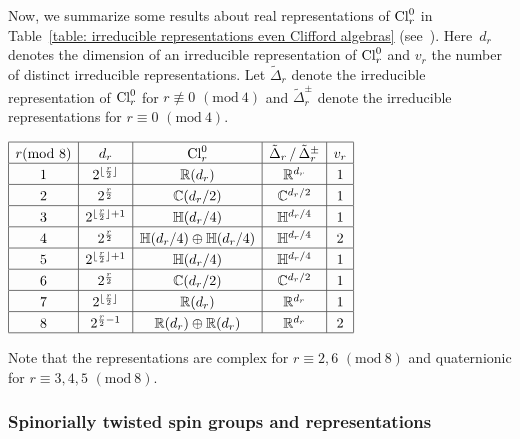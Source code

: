 \documentclass[10pt,a4paper]{amsart}
\newcommand\tstrut{\rule{0pt}{2.6ex}}
\numberwithin{equation}{section}
\begin{document}
Now, we summarize some results about real representations of ${\rm Cl}_r^0$ in Table~\ref{table: irreducible representations even Clifford algebras} (see~\cite{Lawson}). Here~$d_r$ denotes the dimension of an irreducible representation of ${\rm Cl}^0_r$ and $v_r$ the number of distinct irreducible representations. Let $\tilde\Delta_r$ denote the irreducible representation of ${\rm Cl}_r^0$ for $r\not\equiv0$ $(\text{mod}~4) $ and $\tilde\Delta^{\pm}_r$ denote the irreducible representations for $r\equiv0$ $(\text{mod}~4)$.
\begin{table}[h!]\centering
$
\begin{array}{|c|c|c|c|c|c|}
\hline
r(\text{mod}~8)&d_r&{\rm Cl}_r^0&\tilde\Delta_r\, / \,\tilde\Delta_r^\pm& v_r \tstrut\\
\hline
1&2^{\lfloor\frac r2\rfloor}&\mathbb R(d_r)&\mathbb{R}^{d_r}&1 \tstrut\\
\hline
2&2^{\frac r2}&\mathbb C(d_r/2)&\mathbb{C}^{d_r/2}&1 \tstrut\\
\hline
3&2^{\lfloor\frac r2\rfloor+1}&\mathbb H(d_r/4)&\mathbb{H}^{d_r/4}&1 \tstrut\\
\hline
4&2^{\frac r2}&\mathbb H(d_r/4)\oplus \mathbb H(d_r/4)&\mathbb{H}^{d_r/4}&2 \tstrut\\
\hline
5&2^{\lfloor\frac r2\rfloor+1}&\mathbb H(d_r/4)&\mathbb{H}^{d_r/4}&1 \tstrut\\
\hline
6&2^{\frac r2}&\mathbb C(d_r/2)&\mathbb{C}^{d_r/2}&1 \tstrut\\
\hline
7&2^{\lfloor\frac r2\rfloor}&\mathbb R(d_r)&\mathbb{R}^{d_r}&1 \tstrut\\
\hline
8&2^{\frac r2-1}&\mathbb R(d_r)\oplus \mathbb R(d_r)&\mathbb{R}^{d_r}&2 \tstrut\\
\hline
\end{array}
$
\caption{Irreducible representations of even Clifford algebras.}\label{table: irreducible representations even Clifford algebras}
\end{table}

Note that
the representations are complex for $r\equiv 2,6$ $(\text{mod}~8)$ and quaternionic for $r\equiv 3,4,5$
$(\text{mod}~8)$.

\subsubsection{Spinorially twisted spin groups and representations}
\end{document}
